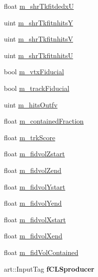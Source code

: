 \begin{DoxyCompactItemize}
\item 
float \hyperlink{classselection_1_1CCincSelection_aaa3a14c43d0e840fa3032a46bd498db1}{m\-\_\-shr\-Tkfitdedx\-U}
\item 
uint \hyperlink{classselection_1_1CCincSelection_a63f55e51e3df0e108aace93b3c34c153}{m\-\_\-shr\-Tkfitnhits\-Y}
\item 
uint \hyperlink{classselection_1_1CCincSelection_a8ad70697906b08285a218c739e8c4815}{m\-\_\-shr\-Tkfitnhits\-V}
\item 
uint \hyperlink{classselection_1_1CCincSelection_a3617f2e35ecc3cd9ceb53108b4c288cb}{m\-\_\-shr\-Tkfitnhits\-U}
\item 
bool \hyperlink{classselection_1_1CCincSelection_a0f08b768b994a2b2798a54a1b11cfaef}{m\-\_\-vtx\-Fiducial}
\item 
bool \hyperlink{classselection_1_1CCincSelection_a7f2d544a3260377cab6db80b8bf81302}{m\-\_\-track\-Fiducial}
\item 
uint \hyperlink{classselection_1_1CCincSelection_ac839d87e0a429876df355fee2a561e60}{m\-\_\-hits\-Outfv}
\item 
float \hyperlink{classselection_1_1CCincSelection_a5ac3c52c6a88691182c3b3c6594d9744}{m\-\_\-contained\-Fraction}
\item 
float \hyperlink{classselection_1_1CCincSelection_a2c3b80516e3731ec9b4f5ccbee6864ba}{m\-\_\-trk\-Score}
\item 
float \hyperlink{classselection_1_1CCincSelection_a291cc5986c0861bf1883ec1c41457afd}{m\-\_\-fidvol\-Zstart}
\item 
float \hyperlink{classselection_1_1CCincSelection_a2510a29ed7584b2d56eb8dff636ceee6}{m\-\_\-fidvol\-Zend}
\item 
float \hyperlink{classselection_1_1CCincSelection_a28900415eda1eb30d6263081e943e6a5}{m\-\_\-fidvol\-Ystart}
\item 
float \hyperlink{classselection_1_1CCincSelection_a01d6a0608356e4ea245f23e1b6934fd3}{m\-\_\-fidvol\-Yend}
\item 
float \hyperlink{classselection_1_1CCincSelection_aab38faac4866d19339aadbc3ac1eb55b}{m\-\_\-fidvol\-Xstart}
\item 
float \hyperlink{classselection_1_1CCincSelection_ae4bab4cf8ea55e54fcdaa66d2fe44c1d}{m\-\_\-fidvol\-Xend}
\item 
float \hyperlink{classselection_1_1CCincSelection_a3412d86b03a97a65fed3d5d8a41ed2c0}{m\-\_\-fid\-Vol\-Contained}
\item 
\hypertarget{classselection_1_1CCincSelection_aa068a963cfe008cf151aaf36ac1be0cb}{art\-::\-Input\-Tag {\bfseries f\-C\-L\-Sproducer}}\label{classselection_1_1CCincSelection_aa068a963cfe008cf151aaf36ac1be0cb}


\end{DoxyCompactItemize}
